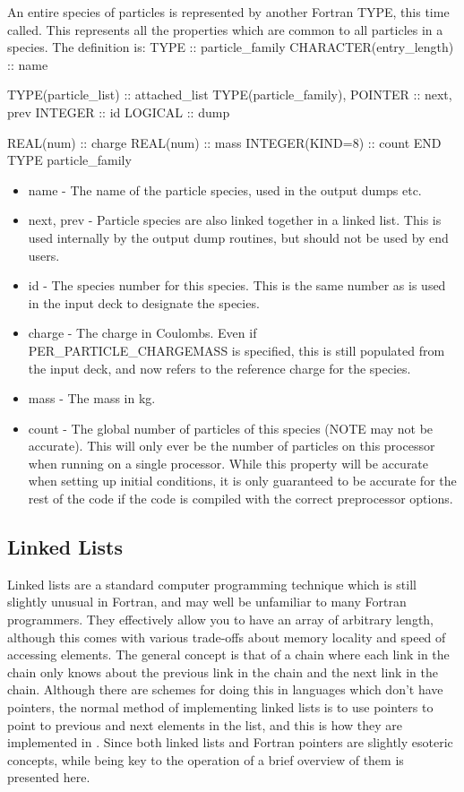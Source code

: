 \documentclass[12pt,a4paper]{article}
\newcommand{\inlinecode}[1]{{\color{warwickred} \bf\texttt{#1}}}
\newcommand{\EPOCH}{{\color{warwickdark}\fontfamily{phv}\selectfont{EPOCH}}}
\newenvironment{boxverbatim}{\lboxverbatim{none}}{\endlboxverbatim}
\begin{document}
An entire species of particles is represented by another Fortran TYPE, this
time called\linebreak \inlinecode{particle\_family}. This represents all the
properties which are common to all particles in a species. The definition is:
\begin{boxverbatim}
  TYPE :: particle_family
    CHARACTER(entry_length) :: name

    TYPE(particle_list) :: attached_list
    TYPE(particle_family), POINTER :: next, prev
    INTEGER :: id
    LOGICAL :: dump

    REAL(num) :: charge
    REAL(num) :: mass
    INTEGER(KIND=8) :: count
  END TYPE particle_family
\end{boxverbatim}

\begin{itemize}
\item name - The name of the particle species, used in the output dumps etc.
\item next, prev - Particle species are also linked together in a linked
  list. This is used internally by the output dump routines, but should not be
  used by end users.
\item id - The species number for this species. This is the same number as is
  used in the input deck to designate the species.
\item charge - The charge in Coulombs. Even if PER\_PARTICLE\_CHARGEMASS is
  specified, this is still populated from the input deck, and now refers to
  the reference charge for the species.
\item mass - The mass in kg.
\item count - The global number of particles of this species (NOTE may not
  be accurate). This will only ever be the number of particles on this
  processor when running on a single processor. While this property will be
  accurate when setting up initial conditions, it is only guaranteed to be
  accurate for the rest of the code if the code is compiled with the correct
  preprocessor options.
\end{itemize}

\subsection{Linked Lists}
Linked lists are a standard computer programming technique which is still
slightly unusual in Fortran, and may well be unfamiliar to many Fortran
programmers. They effectively allow you to have an array of arbitrary length,
although this comes with various trade-offs about memory locality and speed of
accessing elements. The general concept is that of a chain where each link in
the chain only knows about the previous link in the chain and the next link in
the chain. Although there are schemes for doing this in languages which don't
have pointers, the normal method of implementing linked lists is to use
pointers to point to previous and next elements in the list, and this is how
they are implemented in {\EPOCH}. Since both linked lists and Fortran pointers
are slightly esoteric concepts, while being key to the operation of {\EPOCH} a
brief overview of them is presented here.\\
\end{document}
